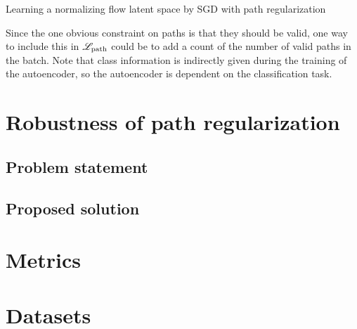 \documentclass[../main.tex]{subfiles}
\begin{document}
\begin{algorithm}
\caption{Learning a normalizing flow latent space by SGD with path regularization}
\label{algo:pathreg}
\end{algorithm}

Since the one obvious constraint on paths is that they should be valid, one way to include this in $\mathscr{L}_\text{path}$ could be to add a count of the number of valid paths in the batch.
Note that class information is indirectly given during the training of the autoencoder, so the autoencoder is dependent on the classification task.

\section{Robustness of path regularization}

\subsection{Problem statement}

\subsection{Proposed solution}

\section{Metrics}


\section{Datasets}
\label{sec:datasets}
\end{document}
